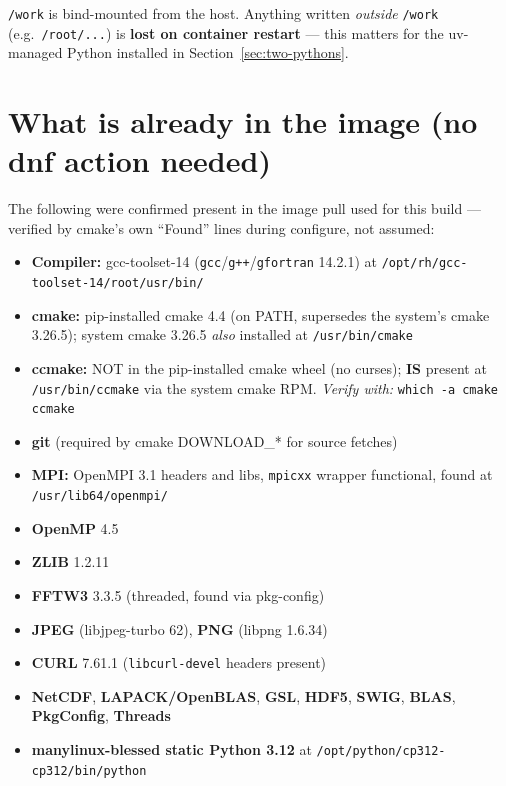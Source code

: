 \documentclass[11pt]{article}
\begin{document}
\texttt{/work} is bind-mounted from the host.  Anything written \emph{outside}
\texttt{/work} (e.g.\ \texttt{/root/...}) is \textbf{lost on container restart}
--- this matters for the uv-managed Python installed in Section~\ref{sec:two-pythons}.

\section{What is already in the image (no dnf action needed)}
\label{sec:image-preinstalled}

The following were confirmed present in the image pull used for this build ---
verified by cmake's own ``Found'' lines during configure, not assumed:

\begin{itemize}
  \item \textbf{Compiler:} gcc-toolset-14 (\texttt{gcc}/\texttt{g++}/\texttt{gfortran} 14.2.1) at
    \texttt{/opt/rh/gcc-toolset-14/root/usr/bin/}
  \item \textbf{cmake:} pip-installed cmake 4.4 (on PATH, supersedes the
    system's cmake 3.26.5); system cmake 3.26.5 \emph{also} installed at
    \texttt{/usr/bin/cmake}
  \item \textbf{ccmake:} NOT in the pip-installed cmake wheel (no curses);
    \textbf{IS} present at \texttt{/usr/bin/ccmake} via the system cmake RPM.
    \emph{Verify with:} \texttt{which -a cmake ccmake}
  \item \textbf{git} (required by cmake DOWNLOAD\_* for source fetches)
  \item \textbf{MPI:} OpenMPI 3.1 headers and libs, \texttt{mpicxx} wrapper
    functional, found at \texttt{/usr/lib64/openmpi/}
  \item \textbf{OpenMP} 4.5
  \item \textbf{ZLIB} 1.2.11
  \item \textbf{FFTW3} 3.3.5 (threaded, found via pkg-config)
  \item \textbf{JPEG} (libjpeg-turbo 62), \textbf{PNG} (libpng 1.6.34)
  \item \textbf{CURL} 7.61.1 (\texttt{libcurl-devel} headers present)
  \item \textbf{NetCDF}, \textbf{LAPACK/OpenBLAS}, \textbf{GSL}, \textbf{HDF5},
    \textbf{SWIG}, \textbf{BLAS}, \textbf{PkgConfig}, \textbf{Threads}
  \item \textbf{manylinux-blessed static Python 3.12} at
    \texttt{/opt/python/cp312-cp312/bin/python}
\end{itemize}
\end{document}
